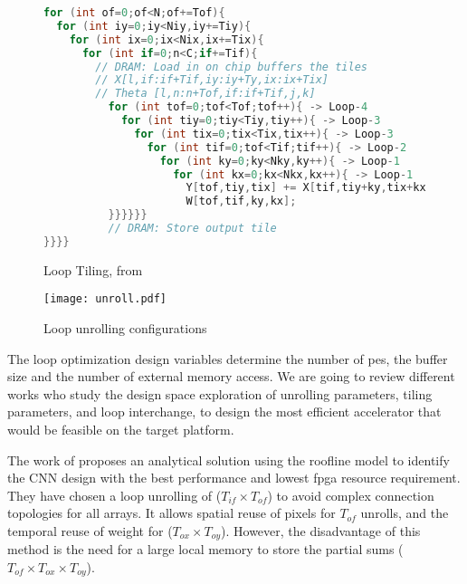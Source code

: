 \begin{figure}
\centering
\begin{lstlisting}[language=Java]
for (int of=0;of<N;of+=Tof){
  for (int iy=0;iy<Niy,iy+=Tiy){
    for (int ix=0;ix<Nix,ix+=Tix){
      for (int if=0;n<C;if+=Tif){
        // DRAM: Load in on chip buffers the tiles
        // X[l,if:if+Tif,iy:iy+Ty,ix:ix+Tix]
        // Theta [l,n:n+Tof,if:if+Tif,j,k]
          for (int tof=0;tof<Tof;tof++){ -> Loop-4
            for (int tiy=0;tiy<Tiy,tiy++){ -> Loop-3
              for (int tix=0;tix<Tix,tix++){ -> Loop-3
                for (int tif=0;tof<Tif;tif++){ -> Loop-2
                  for (int ky=0;ky<Nky,ky++){ -> Loop-1
                    for (int kx=0;kx<Nkx,kx++){ -> Loop-1
                      Y[tof,tiy,tix] += X[tif,tiy+ky,tix+kx] *
                      W[tof,tif,ky,kx];
          }}}}}}
          // DRAM: Store output tile
}}}}
    \end{lstlisting}
    \caption{Loop Tiling, from \cite{abdelouahab_accelerating_2018}}
    \label{fig:looptiling}
\end{figure}
%
\begin{figure}
    \centering
    \texttt{[image: unroll.pdf]}
    \caption{Loop unrolling configurations \cite{ma_optimizing_2018}}
    \label{fog:unroll}
\end{figure}

The loop optimization design variables determine the number of \acrshort{pe}s, the buffer size and the number of external memory access. We are going to review different works who study the design space exploration of unrolling parameters, tiling parameters, and loop interchange, to design the most efficient accelerator that would be feasible on the target platform.

The work of \textcite{zhang_optimizing_2015} proposes an analytical solution using the roofline model \cite{williams_roofline_2009} to identify the CNN design with the best performance and lowest \acrshort{fpga} resource requirement. They have chosen a loop unrolling of ($T_{if} \times T_{of}$) to avoid complex connection topologies for all arrays. It allows spatial reuse of pixels for $T_{of}$ unrolls, and the temporal reuse of weight for ($T_{ox} \times T_{oy}$). However, the disadvantage of this method is the need for a large local memory to store the partial sums ($T_{of} \times T_{ox} \times T_{oy}$).

